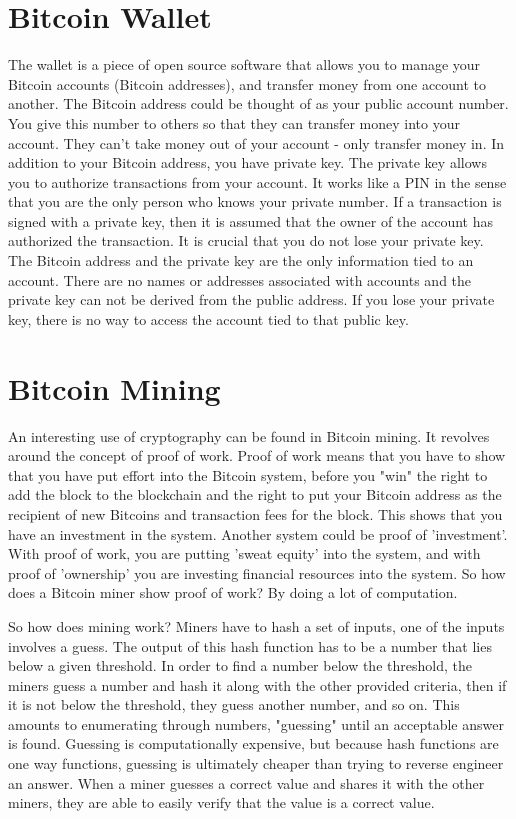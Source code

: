 \documentclass{article}
\begin{document}
	


\section{Bitcoin Wallet}

	The wallet is a piece of open source software that allows you to manage your Bitcoin accounts (Bitcoin addresses), and transfer money from one account to another. The Bitcoin address could be thought of as your public account number. You give this number to others so that they can transfer money into your account. They can't take money out of your account - only transfer money in. In addition to your Bitcoin address, you have private key. The private key allows you to authorize transactions from your account. It works like a PIN in the sense that you are the only person who knows your private number. If a transaction is signed with a private key, then it is assumed that the owner of the account has authorized the transaction. It is crucial that you do not lose your private key. The Bitcoin address and the private key are the only information tied to an account. There are no names or addresses associated with accounts and the private key can not be derived from the public address. If you lose your private key, there is no way to access the account tied to that public key.




\section{Bitcoin Mining}

	An interesting use of cryptography can be found in Bitcoin mining. It revolves around the concept of proof of work. Proof of work means that you have to show that you have put effort into the Bitcoin system, before you "win" the right to add the block to the blockchain and the right to put your Bitcoin address as the recipient of new Bitcoins and transaction fees for the block. This shows that you have an investment in the system. Another system could be proof of 'investment'. With proof of work, you are putting 'sweat equity' into the system, and with proof of 'ownership' you are investing financial resources into the system. So how does a Bitcoin miner show proof of work? By doing a lot of computation.
	
	So how does mining work? Miners have to hash a set of inputs, one of the inputs involves a guess. The output of this hash function has to be a number that lies below a given threshold. In order to find a number below the threshold, the miners guess a number and hash it along with the other provided criteria, then if it is not below the threshold, they guess another number, and so on. This amounts to enumerating through numbers, "guessing" until an acceptable answer is found. Guessing is computationally expensive, but because hash functions are one way functions, guessing is ultimately cheaper than trying to reverse engineer an answer. When a miner guesses a correct value and shares it with the other miners, they are able to easily verify that the value is a correct value.
	
\end{document}
